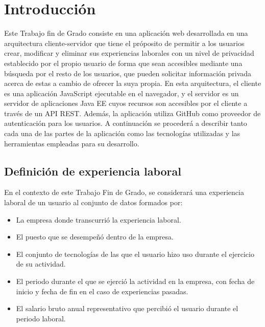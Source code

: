 \documentclass[a4paper, 12pt]{book}
\begin{document}

\cleardoublepage
\chapter{Introducción}
\label{sec:intro} %

Este Trabajo fin de Grado consiste en una aplicación web desarrollada en una arquitectura cliente-servidor que tiene el próposito de permitir a los usuarios crear, modificar y eliminar sus experiencias laborales con un nivel de privacidad establecido por el propio usuario
de forma que sean accesibles mediante una búsqueda por el resto de los usuarios, que pueden solicitar información privada acerca de estas a cambio de ofrecer la suya propia.
En esta arquitectura, el cliente es una aplicación JavaScript ejecutable en el navegador,
y el servidor es un servidor de aplicaciones Java EE cuyos recursos son accesibles por el cliente a través de un API REST. Además, la aplicación utiliza GitHub como proveedor de autenticación para los usuarios.
A continuación se procederá a describir tanto cada una de las partes de la aplicación como las tecnologías utilizadas y las herramientas empleadas para su desarrollo.

\section{Definición de experiencia laboral}
\label{sec:intro_workexperiencedefinition}
En el contexto de este Trabajo Fin de Grado, se considerará una experiencia laboral de un usuario al conjunto de datos formados por:

\begin{itemize}
  \item La empresa donde transcurrió la experiencia laboral.
  \item El puesto que se desempeñó dentro de la empresa.
  \item El conjunto de tecnologías de las que el usuario hizo uso durante el ejercicio de su actividad.
  \item El periodo durante el que se ejerció la actividad en la empresa, con fecha de inicio y fecha de fin en el caso de experiencias pasadas.
  \item El salario bruto anual representativo que percibió el usuario durante el periodo laboral.
\end{itemize}
\end{document}
